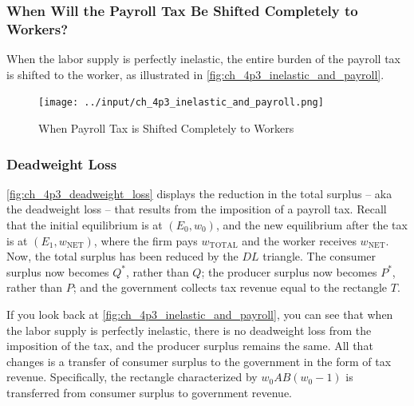 \FloatBarrier


\subsubsection{When Will the Payroll Tax Be Shifted Completely to Workers?}

When the labor supply is perfectly inelastic,
the entire burden of the payroll tax is shifted to the worker,
as illustrated in \autoref{fig:ch_4p3_inelastic_and_payroll}.

\FloatBarrier

\begin{figure}[!htb]
    \centering
        \texttt{[image: ../input/ch\_4p3\_inelastic\_and\_payroll.png]}
    \caption{When Payroll Tax is Shifted Completely to Workers}
    \label{fig:ch_4p3_inelastic_and_payroll}
\end{figure}

\FloatBarrier


\subsubsection{Deadweight Loss}

\autoref{fig:ch_4p3_deadweight_loss}
displays the reduction in the total surplus -- aka the deadweight loss --
that results from the imposition of a payroll tax.
Recall that the initial equilibrium is at $(E_0, w_0)$,
and the new equilibrium after the tax is at $(E_1, w_{\text{NET}})$,
where the firm pays $w_{\text{TOTAL}}$ and the worker receives $w_{\text{NET}}$.
Now, the total surplus has been reduced by the $DL$ triangle.
The consumer surplus now becomes
$Q^*$, rather than $Q$; the producer surplus now 
becomes $P^*$, rather than $P$; and the government
collects tax revenue equal to the rectangle $T$.

If you look back at \autoref{fig:ch_4p3_inelastic_and_payroll},
you can see that when the labor supply is perfectly inelastic,
there is no deadweight loss from the imposition of the tax,
and the producer surplus remains the same. 
All that changes is a transfer of consumer surplus to 
the government in the form of tax revenue. Specifically,
the rectangle characterized by $w_0AB(w_0 - 1)$
is transferred from consumer surplus to government revenue.


